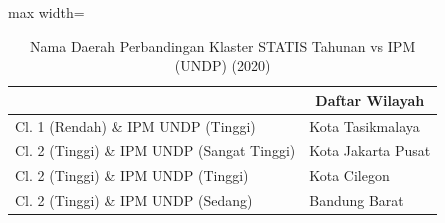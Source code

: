 \begin{table}[H]
\centering
\caption{Nama Daerah Perbandingan Klaster STATIS Tahunan vs IPM (UNDP) (2020)} \label{tab:sample1statis_ipm_name_2020}
\begin{adjustbox}{max width=\textwidth}
\begin{tabular}{|>{\centering\arraybackslash}p{4cm}|p{10cm}|}
\hline
\multicolumn{1}{|c|}{\textbf{Kategori}} & \multicolumn{1}{c|}{\textbf{Daftar Wilayah}} \\
\hline
Cl. 1 (Rendah) \& IPM UNDP (Tinggi) & Kota Tasikmalaya \\
\hline
Cl. 2 (Tinggi) \& IPM UNDP (Sangat Tinggi) & Kota Jakarta Pusat \\
\hline
Cl. 2 (Tinggi) \& IPM UNDP (Tinggi) & Kota Cilegon \\
\hline
Cl. 2 (Tinggi) \& IPM UNDP (Sedang) & Bandung Barat \\
\hline
\end{tabular}
\end{adjustbox}
\end{table}